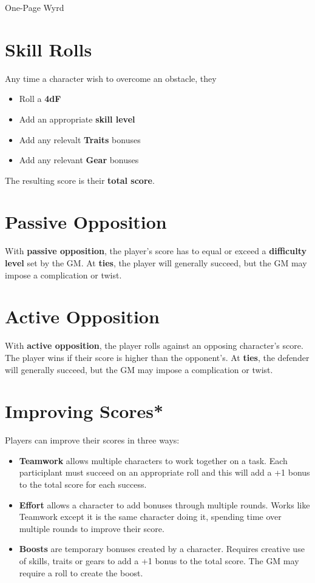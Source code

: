\documentclass[nodeprecatedcode,bg=print]{dndbook}
\begin{document}
\begin{center}
    {\Huge\DndFontPart One-Page Wyrd}\\
    \vspace{1em}
\end{center}

\begin{paracol}{2}
    \section*{Skill Rolls}

    Any time a character wish to overcome an obstacle, they
    \begin{itemize}
        \item Roll a \textbf{4dF}
        \item Add an appropriate \textbf{skill level}
        \item Add any relevalt \textbf{Traits} bonuses
        \item Add any relevant \textbf{Gear} bonuses
    \end{itemize}
    The resulting score is their \textbf{total score}.

    \section*{Passive Opposition}
    With \textbf{passive opposition}, the player's score has to equal or exceed a \textbf{difficulty level} set by the GM. At \textbf{ties}, the player will generally succeed, but the GM may impose a complication or twist.

    \section*{Active Opposition}
    With \textbf{active opposition}, the player rolls against an opposing character's score. The player wins if their score is higher than the opponent's. At \textbf{ties}, the defender will generally succeed, but the GM may impose a complication or twist.

    \section*{Improving Scores*}
    Players can improve their scores in three ways:
    \begin{itemize}
        \item \textbf{Teamwork} allows multiple characters to work together on a task. Each participlant must succeed on an appropriate roll and this will add a +1 bonus to the total score for each success.
        \item \textbf{Effort} allows a character to add bonuses through multiple rounds. Works like Teamwork except it is the same character doing it, spending time over multiple rounds to improve their score.
        \item \textbf{Boosts} are temporary bonuses created by a character. Requires creative use of skills, traits or gears to add a +1 bonus to the total score. The GM may require a roll to create the boost.
    \end{itemize}


\end{paracol}
\end{document}
